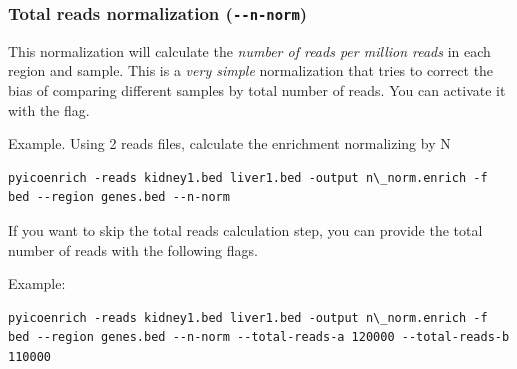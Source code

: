 \documentclass[letterpaper,10pt,english]{sphinxmanual}
\begin{document}
\subsubsection{Total reads normalization (\texttt{-{-}n-norm})}
\label{pyicoenrich:total-reads-normalization-n-norm}
This normalization will calculate the \emph{number of reads per million reads} in each region and sample. This is a \emph{very simple} normalization that tries to correct the bias of comparing different samples by total number of reads. You can activate it with the  flag.

Example. Using 2 reads files, calculate the enrichment normalizing by N

\begin{Verbatim}[commandchars=\\\{\}]
pyicoenrich -reads kidney1.bed liver1.bed -output n\_norm.enrich -f bed --region genes.bed --n-norm
\end{Verbatim}

If you want to skip the total reads calculation step, you can provide the total number of reads with the following flags.

\begin{fulllineitems}
\label{pyicoenrich:cmdoption--total-reads-a}
\end{fulllineitems}


\begin{fulllineitems}
\label{pyicoenrich:cmdoption--total-reads-b}
\end{fulllineitems}


\begin{fulllineitems}
\label{pyicoenrich:cmdoption--total-reads-replica}
\end{fulllineitems}


Example:

\begin{Verbatim}[commandchars=\\\{\}]
pyicoenrich -reads kidney1.bed liver1.bed -output n\_norm.enrich -f bed --region genes.bed --n-norm --total-reads-a 120000 --total-reads-b 110000
\end{Verbatim}
\end{document}
